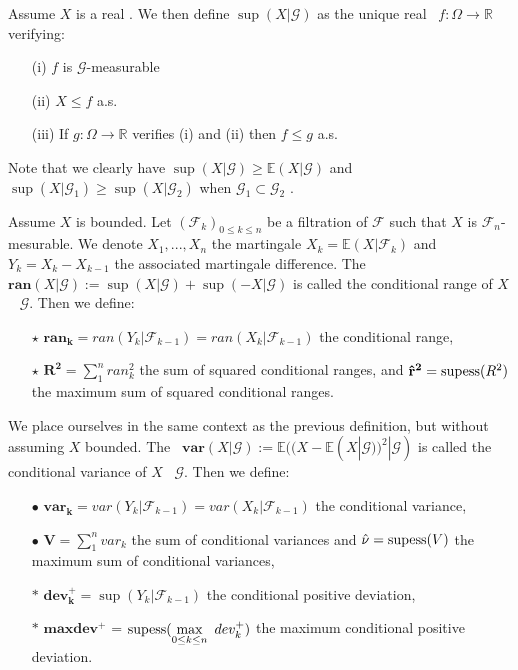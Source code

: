 \begin{definition} Assume $X$ is a real \rv. We then define $\sup(X|\mathcal{G})$ as the unique real \rv~$f:\Omega \rightarrow \mathbb{R}$ verifying:
\begin{itemize}
\item[(i)] $f$ is $\mathcal{G}$-measurable
\item[(ii)] $X \leq f$ a.s.
\item[(iii)] If  $g:\Omega \rightarrow \mathbb{R}$ verifies (i) and (ii) then $ f\le g$ a.s.
\end{itemize}
\end{definition}

Note that we clearly have $\sup(X|\mathcal{G}) \geq \mathbb{E}(X|\mathcal{G}) $ and  $\sup(X|\mathcal{G}_1) \geq  \sup(X|\mathcal{G}_2) $ when  $ \mathcal{G}_1 \subset \mathcal{G}_2$ .


\begin{definition}
\label{defpreli1}
Assume $X$ is bounded. Let $(\mathcal{F}_k)_{0\leq k \leq n}$ be a filtration of $\mathcal{F}$ such that $X$ is $\mathcal{F}_n$-mesurable. We denote $X_1,...,X_n$ the martingale $X_k=\mathbb{E}(X|\mathcal{F}_k)$ and $Y_k=X_k - X_{k-1}$ the associated martingale difference. The \rv~$\mathbf{ran}(X \vert \mathcal{G}) := \sup(X | \mathcal{G}) + \sup(-X \vert \mathcal{G}) $ is called the conditional range of $X$ \wrt~ $\mathcal{G}$. Then we define:
\begin{itemize}
\item [$\star$] $ \mathbf{ran_k} = ran (Y_k|\mathcal{F}_{k-1}) = ran(X_k|\mathcal{F}_{k-1})$ the conditional range,
\item [$\star$] $\mathbf{R^2} = \sum_{1}^{n} ran_k^2$  the sum of squared conditional ranges, and $\mathbf{\hat{r}^2} = \supess(R^2)$ the maximum sum of squared conditional ranges.
\end{itemize}
\end{definition}

\begin{definition}
We place ourselves in the same context as the previous definition, but without assuming $X$ bounded. The \rv~$\mathbf{var}(X|\mathcal{G}) := \mathbb{E}((X-\mathbb{E}(X|\mathcal{G}))^2|\mathcal{G}) $ is called the conditional variance of $X$ \wrt~$\mathcal{G}$. Then we define:
\begin{itemize}
\item [$\bullet$] $\mathbf{var_k} = var(Y_k|\mathcal{F}_{k-1})=var(X_k|\mathcal{F}_{k-1})$ the conditional variance, 
\item [$\bullet$] $\mathbf{V} = \sum_{1}^{n} var_k$ the sum of conditional variances and $\hat\nu= \supess(V)$ the maximum sum of conditional variances,
\item [$\ast$] $\mathbf{dev_k^+} = \sup(Y_k|\mathcal{F}_{k-1})$ the conditional positive deviation,
\item  [$\ast$] $\mathbf{maxdev^+} $ = $ \supess(\displaystyle\max_{0 \leq k \leq n}~ dev_k^+)$  the maximum conditional positive deviation.
\end{itemize}
\end{definition}

